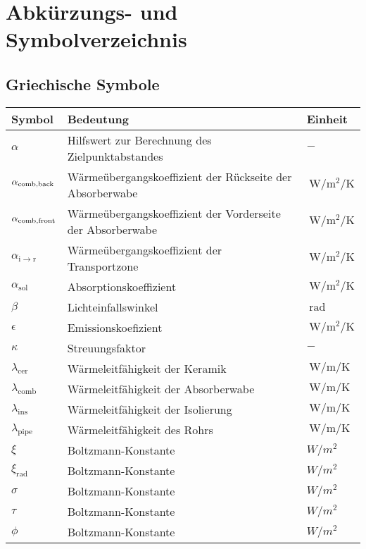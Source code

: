 \chapter*{Abkürzungs- und Symbolverzeichnis}
\renewcommand{\arraystretch}{1.5}
%

\vspace*{-1cm}
\section*{Griechische Symbole}
\begin{table}[ht!]
    \centering
\begin{tabular}{m{}m{}m{}}
        \rowcolor{white}
Symbol   & Bedeutung          & Einheit  \\
        \midrule
$\alpha$ & Hilfswert zur Berechnung des Zielpunktabstandes     & $-$ \\
$\alpha_{\mathrm{comb},\mathrm{back}}$ & Wärmeübergangskoeffizient der Rückseite der Absorberwabe     & $\SI{}{\watt\per\metre\squared\per\kelvin}$ \\
$\alpha_{\mathrm{comb},\mathrm{front}}$ & Wärmeübergangskoeffizient der Vorderseite der Absorberwabe     & $\SI{}{\watt\per\metre\squared\per\kelvin}$ \\
$\alpha_{\mathrm{i\to r}}$ & Wärmeübergangskoeffizient der Transportzone     & $\SI{}{\watt\per\metre\squared\per\kelvin}$ \\
$\alpha_{\mathrm{sol}}$ & Absorptionskoeffizient     & $\SI{}{\watt\per\metre\squared\per\kelvin}$ \\
$\beta$ & Lichteinfallswinkel & $\SI{}{\radian}$  \\
$\epsilon$ & Emissionskoefizient & $\SI{}{\watt\per\metre\squared\per\kelvin}$  \\
$\kappa$ & Streuungsfaktor & $-$  \\
$\lambda_{\mathrm{cer}}$ & Wärmeleitfähigkeit der Keramik & $\SI{}{\watt\per\metre\per\kelvin}$  \\
$\lambda_{\mathrm{comb}}$ & Wärmeleitfähigkeit der Absorberwabe & $\SI{}{\watt\per\metre\per\kelvin}$  \\
$\lambda_{\mathrm{ins}}$ & Wärmeleitfähigkeit der Isolierung & $\SI{}{\watt\per\metre\per\kelvin}$  \\
$\lambda_{\mathrm{pipe}}$ & Wärmeleitfähigkeit des Rohrs & $\SI{}{\watt\per\metre\per\kelvin}$  \\
$\xi$ & Boltzmann-Konstante & $W/m^2$  \\
$\xi_{\mathrm{rad}}$ & Boltzmann-Konstante & $W/m^2$  \\
$\sigma$ & Boltzmann-Konstante & $W/m^2$  \\
$\tau$ & Boltzmann-Konstante & $W/m^2$  \\
$\phi$ & Boltzmann-Konstante & $W/m^2$  \\
    \end{tabular}
\end{table}
\clearpage
\newpage \vspace*{-1cm}

